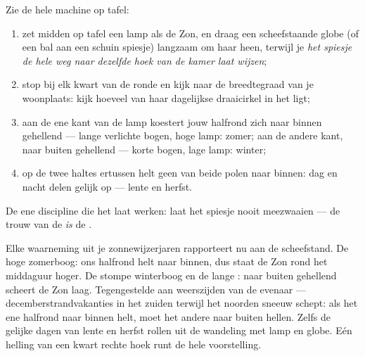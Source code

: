 \begin{method}\label{met:g6:sun-earth-moon:globe}
Zie de hele machine op tafel:
\begin{enumerate}
  \item zet midden op tafel een lamp als de Zon, en draag een
        scheefstaande globe (of een bal aan een schuin spiesje)
        langzaam om haar heen, terwijl je \emph{het spiesje de hele
        weg naar dezelfde hoek van de kamer laat wijzen};
  \item stop bij elk kwart van de ronde en kijk naar de
        breedtegraad van je woonplaats: kijk hoeveel van haar
        dagelijkse draaicirkel in het  ligt;
  \item aan de ene kant van de lamp koestert jouw halfrond zich
        naar binnen gehellend --- lange verlichte bogen, hoge lamp:
        zomer; aan de andere kant, naar buiten gehellend --- korte
        bogen, lage lamp: winter;
  \item op de twee haltes ertussen helt geen van beide polen naar
        binnen: dag en nacht delen gelijk op --- lente en herfst.
\end{enumerate}
De ene discipline die het laat werken: laat het spiesje nooit
meezwaaien --- de trouw van de  \emph{is} de .
\end{method}

\begin{example}\label{ex:g6:sun-earth-moon:clues}
Elke waarneming uit je zonnewijzerjaren rapporteert nu aan de
scheefstand. De hoge zomerboog: ons halfrond helt naar binnen, dus
staat de Zon rond het middaguur hoger. De stompe winterboog en de
lange : naar buiten gehellend scheert de Zon laag.
Tegengestelde  aan weerszijden van de evenaar ---
decemberstrandvakanties in het zuiden terwijl het noorden sneeuw
schept: als het ene halfrond naar binnen helt, moet het andere naar
buiten hellen. Zelfs de gelijke dagen van lente en herfst rollen uit
de wandeling met lamp en globe. Eén helling van een kwart rechte hoek
runt de hele voorstelling.
\end{example}

